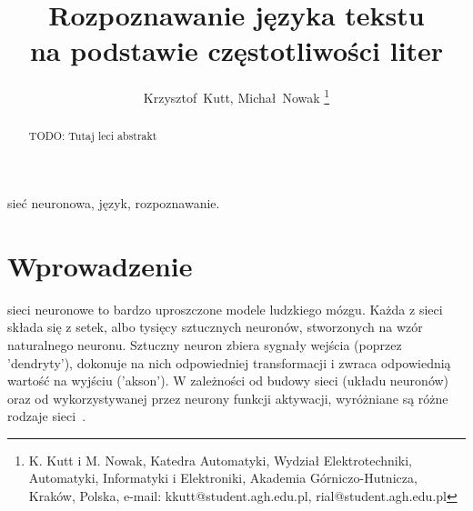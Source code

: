 \documentclass[journal]{IEEEtran}
\begin{document}
%
\title{Rozpoznawanie języka tekstu \\ na podstawie częstotliwości liter}

\author{Krzysztof~Kutt, Michał~Nowak
\thanks{K. Kutt i M. Nowak, Katedra Automatyki, Wydział Elektrotechniki, Automatyki, Informatyki i Elektroniki,
Akademia Górniczo-Hutnicza, Kraków, Polska, e-mail: kkutt@student.agh.edu.pl, rial@student.agh.edu.pl}}

%
{}

\maketitle


\begin{abstract}
TODO: Tutaj leci abstrakt
\end{abstract}

\begin{IEEEkeywords}
sieć neuronowa, język, rozpoznawanie.
\end{IEEEkeywords}


\section{Wprowadzenie}
% 
% 
% 
% 
%

 sieci neuronowe to bardzo uproszczone modele ludzkiego mózgu.
Każda z sieci składa się z setek, albo tysięcy sztucznych neuronów, stworzonych na wzór naturalnego
neuronu. Sztuczny neuron zbiera sygnały wejścia (poprzez 'dendryty'), dokonuje na nich odpowiedniej
transformacji i zwraca odpowiednią wartość na wyjściu ('akson'). W zależności od budowy sieci (układu
neuronów) oraz od wykorzystywanej przez neurony funkcji aktywacji, wyróżniane są różne rodzaje sieci~\cite{tad:sieci}.
\end{document}

